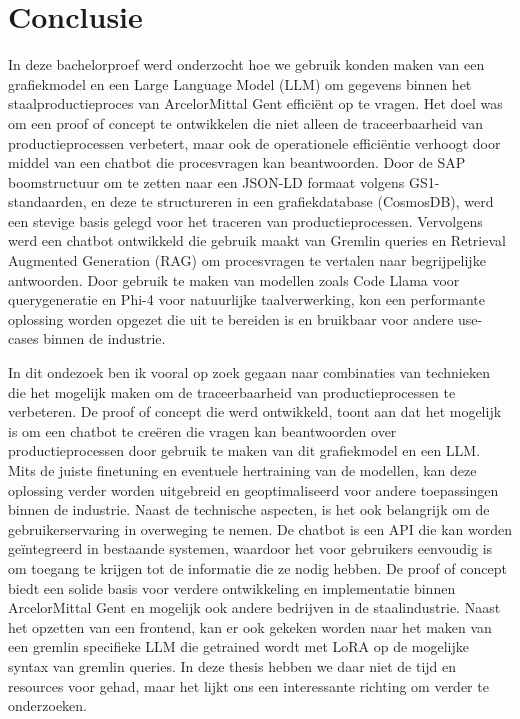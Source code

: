 
\chapter{Conclusie}%
\label{ch:conclusie}
In deze bachelorproef werd onderzocht hoe we gebruik konden maken van een grafiekmodel en een Large Language Model (LLM) om gegevens binnen het staalproductieproces van ArcelorMittal Gent efficiënt op te vragen. 
Het doel was om een proof of concept te ontwikkelen die niet alleen de traceerbaarheid van productieprocessen verbetert, maar ook de operationele efficiëntie verhoogt door middel van een chatbot die procesvragen kan beantwoorden.
Door de SAP boomstructuur om te zetten naar een JSON-LD formaat volgens GS1-standaarden, en deze te structureren in een grafiekdatabase (CosmosDB), werd een stevige basis gelegd voor het traceren van productieprocessen.
Vervolgens werd een chatbot ontwikkeld die gebruik maakt van Gremlin queries en Retrieval Augmented Generation (RAG) om procesvragen te vertalen naar begrijpelijke antwoorden.
Door gebruik te maken van modellen zoals Code Llama voor querygeneratie en Phi-4 voor natuurlijke taalverwerking, kon een performante oplossing worden opgezet die uit te bereiden is en bruikbaar voor andere use-cases binnen de industrie.

In dit ondezoek ben ik vooral op zoek gegaan naar combinaties van technieken die het mogelijk maken om de traceerbaarheid van productieprocessen te verbeteren.
De proof of concept die werd ontwikkeld, toont aan dat het mogelijk is om een chatbot te creëren die vragen kan beantwoorden over productieprocessen door gebruik te maken van dit grafiekmodel en een LLM.\@
Mits de juiste finetuning en eventuele hertraining van de modellen, kan deze oplossing verder worden uitgebreid en geoptimaliseerd voor andere toepassingen binnen de industrie.
Naast de technische aspecten, is het ook belangrijk om de gebruikerservaring in overweging te nemen.
De chatbot is een API die kan worden geïntegreerd in bestaande systemen, waardoor het voor gebruikers eenvoudig is om toegang te krijgen tot de informatie die ze nodig hebben.
De proof of concept biedt een solide basis voor verdere ontwikkeling en implementatie binnen ArcelorMittal Gent en mogelijk ook andere bedrijven in de staalindustrie.
Naast het opzetten van een frontend, kan er ook gekeken worden naar het maken van een gremlin specifieke LLM die getrained wordt met LoRA op de mogelijke syntax van gremlin queries.
In deze thesis hebben we daar niet de tijd en resources voor gehad, maar het lijkt ons een interessante richting om verder te onderzoeken.



